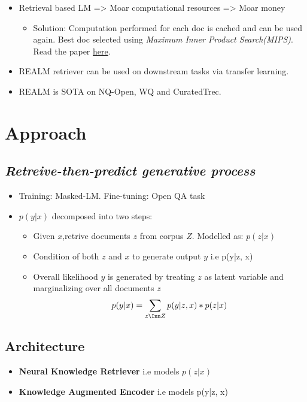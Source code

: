 \documentclass[a4paper]{article}
\begin{document}
\begin{itemize}
    \item Retrieval based LM => Moar computational resources => Moar money
        \begin{itemize}
            \item Solution: Computation performed for each doc is cached and can be used again. Best doc selected using \textit{Maximum Inner Product Search(MIPS)}. Read the paper \href{https://cs.stanford.edu/~ermon/papers/ICML_MIPS_Gumbel.pdf}{here}.  
        \end{itemize}
    \item REALM retriever can be used on downstream tasks via transfer learning.
    \item REALM is SOTA on NQ-Open, WQ and CuratedTrec.
\end{itemize}
\section{Approach}
\subsection{\textit{Retreive-then-predict generative process} }
\begin{itemize}
    \item Training: Masked-LM. Fine-tuning: Open QA task
    \item $p(y|x)$ decomposed into two steps:
        \begin{itemize}
            \item Given $x$,retrive documents $z$ from corpus $Z$. Modelled as: $p(z|x)$
            \item Condition of both $z$ and $x$ to generate output $y$ i.e p(y|z, x)
            \item Overall likelihood $y$ is generated by treating  $z$ as latent variable and marginalizing over all documents $z$ 
                \begin{equation}
                    \begin{split}
                        p(y|x) = \sum_{z \Inn Z} p(y|z, x) * p(z|x)
                    \end{split}
                \end{equation}
        \end{itemize}
\end{itemize}
\subsection{Architecture}
\begin{itemize}
    \item \textbf{Neural Knowledge Retriever} i.e models $p(z|x)$ 
    \item \textbf{Knowledge Augmented Encoder} i.e models p(y|z, x) 
\end{itemize}
\end{document}
